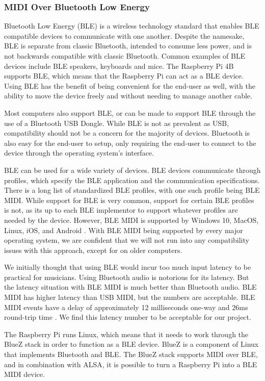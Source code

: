 \subsubsection{MIDI Over Bluetooth Low Energy}
\label{sec:ble_midi}

Bluetooth Low Energy (BLE) is a wireless technology standard that enables BLE compatible
devices to communicate with one another. Despite the namesake, BLE is separate from
classic Bluetooth, intended to consume less power, and is not backwards compatible with
classic Bluetooth. Common examples of BLE devices include BLE speakers, keyboards and
mice. The Raspberry Pi 4B supports BLE, which means that the Raspberry Pi can act as a BLE
device. Using BLE has the benefit of being convenient for the end-user as well, with the
ability to move the device freely and without needing to manage another cable.

Most computers also support BLE, or can be made to support BLE through the use of a
Bluetooth USB Dongle. While BLE is not as prevalent as USB, compatibility should not be a
concern for the majority of devices. Bluetooth is also easy for the end-user to setup,
only requiring the end-user to connect to the device through the operating system's
interface.

BLE can be used for a wide variety of devices. BLE devices communicate through profiles,
which specify the BLE  application and the communication specifications. There is a long
list of standardized BLE profiles, with one such profile being BLE MIDI. While support for
BLE is very common, support for certain BLE profiles is not, as its up to each BLE
implementor to support whatever profiles are needed by the device. However, BLE MIDI is
supported by Windows 10, MacOS, Linux, iOS, and Android \autocite{inproceedings}. With BLE
MIDI being supported by every major operating system, we are confident that we will not
run into any compatibility issues with this approach, except for on older computers.

We initially thought that using BLE would incur too much input latency to be practical for
musicians. Using Bluetooth audio is notorious for its latency. But the latency situation
with BLE MIDI is much better than Bluetooth audio. BLE MIDI has higher latency than USB
MIDI, but the numbers are acceptable. BLE MIDI events have a delay of approximately 12
milliseconds one-way and 26ms round-trip time \autocite{inproceedings}. We find this
latency number to be acceptable for our project.

The Raspberry Pi runs Linux, which means that it needs to work through the BlueZ stack in
order to function as a BLE device. BlueZ is a component of Linux that implements Bluetooth
and BLE. The BlueZ stack supports MIDI over BLE, and in combination with ALSA, it is
possible to turn a Raspberry Pi into a BLE MIDI device.

